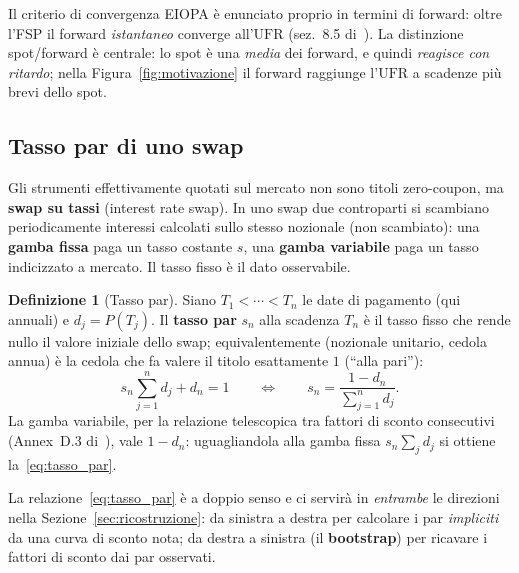 \documentclass[11pt,a4paper]{article}
\theoremstyle{plain}
\theoremstyle{definition}
\newtheorem{definizione}[teorema]{Definizione}
\theoremstyle{remark}
\newcommand{\UFR}{\mathrm{UFR}}
\begin{document}
Il criterio di convergenza EIOPA \`e enunciato proprio in termini di forward: oltre l'FSP il
forward \emph{istantaneo} converge all'$\UFR$ (sez.~8.5 di~\cite{eiopa2026}). La
distinzione spot/forward \`e centrale: lo spot \`e una \emph{media} dei forward, e quindi
\emph{reagisce con ritardo}; nella Figura~\ref{fig:motivazione} il forward raggiunge l'$\UFR$
a scadenze pi\`u brevi dello spot.

\subsection{Tasso par di uno swap}
\label{sec:par}

Gli strumenti effettivamente quotati sul mercato non sono titoli zero-coupon, ma
\textbf{swap su tassi} (interest rate swap). In uno swap due controparti si scambiano
periodicamente interessi calcolati sullo stesso nozionale (non scambiato): una \textbf{gamba
fissa} paga un tasso costante $s$, una \textbf{gamba variabile} paga un tasso indicizzato a
mercato. Il tasso fisso \`e il dato osservabile.

\begin{definizione}[Tasso par]
\label{def:par}
Siano $T_1<\cdots<T_n$ le date di pagamento (qui annuali) e $d_j=P(T_j)$. Il \textbf{tasso
par} $s_n$ alla scadenza $T_n$ \`e il tasso fisso che rende nullo il valore iniziale dello
swap; equivalentemente (nozionale unitario, cedola annua) \`e la cedola che fa valere il
titolo esattamente $1$ (``alla pari''):
\begin{equation}
  \label{eq:tasso_par}
  s_n \sum_{j=1}^{n} d_j + d_n = 1
  \qquad\Longleftrightarrow\qquad
  s_n = \frac{1 - d_n}{\displaystyle\sum_{j=1}^{n} d_j}.
\end{equation}
La gamba variabile, per la relazione telescopica tra fattori di sconto consecutivi (Annex~D.3
di~\cite{eiopa2026}), vale $1-d_n$: uguagliandola alla gamba fissa $s_n\sum_j d_j$ si ottiene
la~\eqref{eq:tasso_par}.
\end{definizione}

La relazione~\eqref{eq:tasso_par} \`e a doppio senso e ci servir\`a in \emph{entrambe} le
direzioni nella Sezione~\ref{sec:ricostruzione}: da sinistra a destra per calcolare i par
\emph{impliciti} da una curva di sconto nota; da destra a sinistra (il \textbf{bootstrap})
per ricavare i fattori di sconto dai par osservati.
\end{document}
